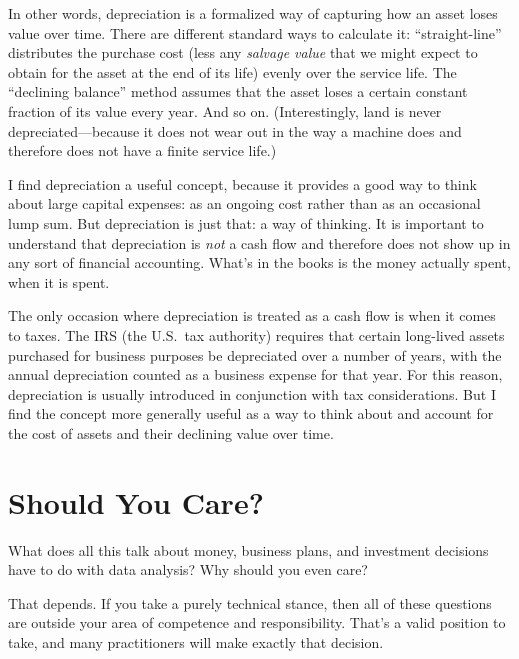 In other words, depreciation is a formalized way of capturing how an
asset loses value over time. There are different standard ways to
calculate it: ``straight-line'' distributes the purchase cost (less
any \emph{salvage value} that\vadjust{\pagebreak} we might expect to obtain for the asset
at the end of its life) evenly over the service life. The ``declining
balance'' method assumes that the asset loses a certain constant
fraction of its value every year. And so on.  (Interestingly, land is
never depreciated---because it does not wear out in the way a machine
does and therefore does not have a finite service life.)

I find depreciation a useful concept, because it provides a good way
to think about large capital expenses: as an ongoing cost rather than
as an occasional lump sum. But depreciation is just that: a way of
thinking. It is important to understand that depreciation is
\emph{not} a cash flow and therefore does not show up in any sort of
financial accounting. What's in the books is the money actually spent,
when it is spent.

The only occasion where depreciation is treated as a cash flow is when
it comes to taxes. The IRS (the U.S.\ tax authority) requires that
certain long-lived assets purchased for business purposes be
depreciated over a number of years, with the annual depreciation
counted as a business expense for that year. For this reason,
depreciation is usually introduced in conjunction with tax
considerations. But I find the concept more generally useful as a way
to think about and account for the cost of assets and their declining
value over time.


\section{Should You Care?}


What does all this talk about money, business plans, and investment
decisions have to do with data analysis? Why should you even care?

That depends. If you take a purely technical stance, then all of these
questions are outside your area of competence and responsibility.
That's a valid position to take, and many practitioners will make
exactly that decision.

